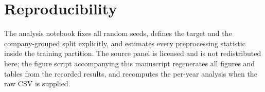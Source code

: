 \documentclass[manuscript,nonacm]{acmart}
\begin{document}
\section*{Reproducibility}
The analysis notebook fixes all random seeds, defines the target and the
company-grouped split explicitly, and estimates every preprocessing statistic inside the
training partition. The source panel is licensed and is not redistributed here; the
figure script accompanying this manuscript regenerates all figures and tables from the
recorded results, and recomputes the per-year analysis when the raw CSV is supplied.



\end{document}

